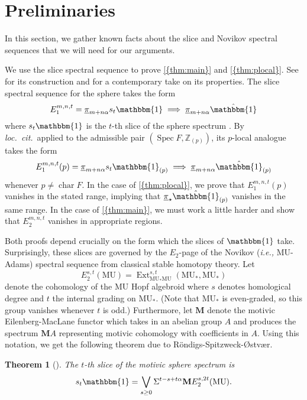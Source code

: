 \documentclass[10pt]{amsart}
\numberwithin{equation}{section}
\theoremstyle{plain}
\newtheorem{theorem}[theorem]{Theorem}
\theoremstyle{definition}
\theoremstyle{remark}
\begin{document}
\section{Preliminaries}\label{sec:prelim}

In this section, we gather known facts about the slice and Novikov spectral sequences that we will need for our arguments.

We use the slice spectral sequence to prove {\autoref{{thm:main}}} and {\autoref{{thm:plocal}}}.  See \cite{v:newopen} for its construction and \cite{RSO:pi1} for a contemporary take on its properties.  The slice spectral sequence for the sphere takes the form
\[
  E_1^{m,n,t} = {\underline{\smash{\pi}}}_{m+n\alpha}s_t {\mathbbm{1}}\implies {\underline{\smash{\pi}}}_{m+n\alpha}\hat {\mathbbm{1}}
\]
where $s_t{\mathbbm{1}}$ is the $t$-th slice of the sphere spectrum \cite[Theorem 3.50]{RSO:pi1}.  By \emph{loc.~cit.}~applied to the admissible pair $({\operatorname{Spec}} F, {\mathbb{Z}}_{(p)})$, its $p$-local analogue takes the form
\[
  E_1^{m,n,t}(p) = {\underline{\smash{\pi}}}_{m+n\alpha}s_t{\mathbbm{1}}_{(p)}\implies {\underline{\smash{\pi}}}_{m+n\alpha}\hat{\mathbbm{1}}_{(p)}
\]
whenever $p\ne {\operatorname{char}} F$.  In the case of {\autoref{{thm:plocal}}}, we prove that $E_1^{m,n,t}(p)$ vanishes in the stated range, implying that ${\underline{\smash{\pi}}}_\star \hat {\mathbbm{1}}_{(p)}$ vanishes in the same range.  In the case of {\autoref{{thm:main}}}, we must work a little harder and show that $E_2^{m,n,t}$ vanishes in appropriate regions.

Both proofs depend crucially on the form which the slices of ${\mathbbm{1}}$ take.  Surprisingly, these slices are governed by the $E_2$-page of the Novikov (\emph{i.e.,} ${\mathrm{MU}}$-Adams) spectral sequence from classical stable homotopy theory.  Let 
\[
  E_2^{s,t}({\mathrm{MU}}) = \operatorname{Ext}_{{\mathrm{MU}}_*{\mathrm{MU}}}^{s,t}({\mathrm{MU}}_*,{\mathrm{MU}}_*)
\]
denote the cohomology of the ${\mathrm{MU}}$ Hopf algebroid where $s$ denotes homological degree and $t$ the internal grading on ${\mathrm{MU}}_*$.  (Note that ${\mathrm{MU}}_*$ is even-graded, so this group vanishes whenever $t$ is odd.)  Furthermore, let ${\mathbf{M}}$ denote the motivic Eilenberg-MacLane functor which takes in an abelian group $A$ and produces the spectrum ${\mathbf{M}} A$ representing motivic cohomology with coefficients in $A$.  Using this notation, we get the following theorem due to R\"ondigs-Spitzweck-{\O}stv{\ae}r.

\begin{theorem}[{\cite[Theorem 2.12]{RSO:pi1}}]\label{thm:slice}
The $t$-th slice of the motivic sphere spectrum is
\[
  s_t{\mathbbm{1}} = \bigvee_{s\ge 0}\Sigma^{t-s+t\alpha}{\mathbf{M}} E_2^{s,2t}({\mathrm{MU}}).
\]
\hfill \qedsymbol
\end{theorem}
\end{document}
